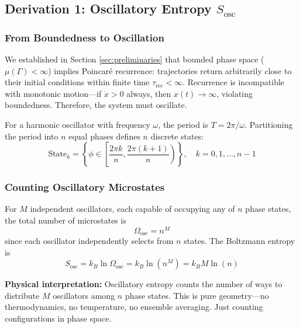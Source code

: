 \documentclass[twocolumn,10pt]{article}
\theoremstyle{remark}
\begin{document}
\subsection{Derivation 1: Oscillatory Entropy $S_{\text{osc}}$}

\subsubsection{From Boundedness to Oscillation}

We established in Section \ref{sec:preliminaries} that bounded phase space ($\mu(\Gamma) < \infty$) implies Poincaré recurrence: trajectories return arbitrarily close to their initial conditions within finite time $\tau_{\text{rec}} < \infty$. Recurrence is incompatible with monotonic motion—if $\dot{x} > 0$ always, then $x(t) \to \infty$, violating boundedness. Therefore, the system must oscillate.

For a harmonic oscillator with frequency $\omega$, the period is $T = 2\pi/\omega$. Partitioning the period into $n$ equal phases defines $n$ discrete states:
\begin{equation}
    \text{State}_k = \left\{\phi \in \left[\frac{2\pi k}{n}, \frac{2\pi(k+1)}{n}\right)\right\}, \quad k = 0, 1, \ldots, n-1
    \label{eq:phase_partition}
\end{equation}

\subsubsection{Counting Oscillatory Microstates}

For $M$ independent oscillators, each capable of occupying any of $n$ phase states, the total number of microstates is
\begin{equation}
    \Omega_{\text{osc}} = n^M
    \label{eq:Omega_osc}
\end{equation}
since each oscillator independently selects from $n$ states. The Boltzmann entropy is
\begin{equation}
    S_{\text{osc}} = k_B \ln \Omega_{\text{osc}} = k_B \ln(n^M) = k_B M \ln(n)
    \label{eq:S_osc_derivation}
\end{equation}

\textbf{Physical interpretation:} Oscillatory entropy counts the number of ways to distribute $M$ oscillators among $n$ phase states. This is pure geometry—no thermodynamics, no temperature, no ensemble averaging. Just counting configurations in phase space.
\end{document}
